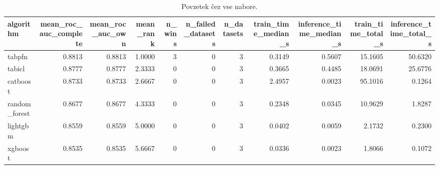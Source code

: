 \begin{table}[htbp]
\centering
\caption{Povzetek čez vse nabore.}
\label{tab:overall}
\begin{tabular}{lrrrrrrrrrr}
\hline
algorithm & mean\_roc\_auc\_complete & mean\_roc\_auc\_own & mean\_rank & n\_wins & n\_failed\_datasets & n\_datasets & train\_time\_median\_s & inference\_time\_median\_s & train\_time\_total\_s & inference\_time\_total\_s \\
\hline
tabpfn & 0.8813 & 0.8813 & 1.0000 & 3 & 0 & 3 & 0.3149 & 0.5607 & 15.1605 & 50.6320 \\
tabicl & 0.8777 & 0.8777 & 2.3333 & 0 & 0 & 3 & 0.3665 & 0.4485 & 18.0691 & 25.6776 \\
catboost & 0.8733 & 0.8733 & 2.6667 & 0 & 0 & 3 & 2.4957 & 0.0023 & 95.1016 & 0.1264 \\
random\_forest & 0.8677 & 0.8677 & 4.3333 & 0 & 0 & 3 & 0.2348 & 0.0345 & 10.9629 & 1.8287 \\
lightgbm & 0.8559 & 0.8559 & 5.0000 & 0 & 0 & 3 & 0.0402 & 0.0059 & 2.1732 & 0.2300 \\
xgboost & 0.8535 & 0.8535 & 5.6667 & 0 & 0 & 3 & 0.0336 & 0.0023 & 1.8066 & 0.1072 \\
\hline
\end{tabular}
\end{table}
